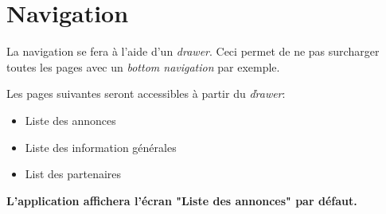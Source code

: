 \documentclass[french]{report}
\begin{document}
\section{Navigation}
La navigation se fera à l'aide d'un \textit{drawer}. Ceci permet de ne pas surcharger
toutes les pages avec un \textit{bottom navigation} par exemple.

Les pages suivantes seront accessibles à partir du \textit{ďrawer}:
\begin{itemize}
    \item Liste des annonces
    \item Liste des information générales
    \item List des partenaires
\end{itemize}
\vspace{1em}

\textbf{L'application affichera l'écran "Liste des annonces" par défaut.}
\end{document}
